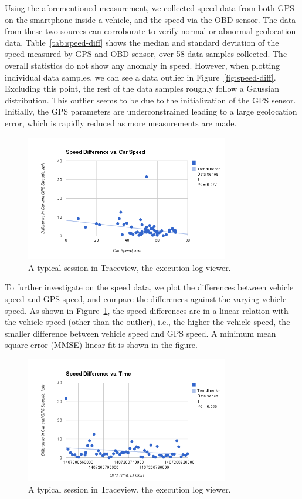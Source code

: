 Using the aforementioned measurement, we collected speed data from both GPS 
on the smartphone inside a vehicle, and the speed via the OBD sensor. 
The data from these two sources can corroborate to verify normal or abnormal 
geolocation data. Table~\ref{tab:speed-diff} shows the median and standard deviation
of the speed measured by GPS and OBD sensor, over 58 data samples collected. 
The overall statistics do not show any anomaly in speed. However, when plotting 
individual data samples, we can see a data outlier in Figure~\ref{fig:speed-diff}. 
Excluding this point, the rest of the data samples roughly follow a Gaussian 
distribution. This outlier seems to be due to the initialization of the
GPS sensor.  Initially, the GPS parameters are underconstrained leading to a large 
geolocation error, which is rapidly reduced as more measurements are made.


\begin{figure}
\centering
\includegraphics[width=3.5in]{car.png}
\caption{A typical session in Traceview, the execution log viewer.}
\label{fig:car}
\end{figure}

To further investigate on the speed data, we plot the differences between 
vehicle speed and GPS speed, and compare the differences against 
the varying vehicle speed. As shown in Figure~\ref{fig:car}, the speed 
differences are in a linear relation with the vehicle speed 
(other than the outlier), i.e., the 
higher the vehicle speed, the smaller difference between vehicle 
speed and GPS speed. 
A minimum mean square error (MMSE) linear fit is shown in the figure.

\begin{figure}
\centering
\includegraphics[width=3.5in]{time.png}
\caption{A typical session in Traceview, the execution log viewer.}
\label{fig:time}
\end{figure}

